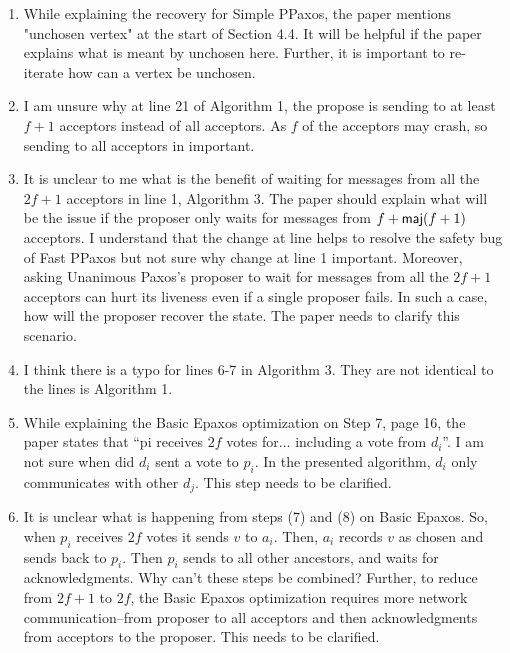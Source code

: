 \documentclass[letterpaper,twocolumn,10pt]{article}
\newenvironment{reviewerquote}
{\list{}{\leftmargin=\parindent\rightmargin=0in}\item[] \itshape \color{ReviewerDarkGray}}%
{\endlist}
\begin{document}
\begin{reviewerquote}
  \begin{enumerate}
    \setcounter{enumi}{0}
    \item
      While explaining the recovery for Simple PPaxos, the paper mentions
      "unchosen vertex" at the start of Section 4.4. It will be helpful if the
      paper explains what is meant by unchosen here. Further, it is important
      to re-iterate how can a vertex be unchosen.
    \item
      I am unsure why at line 21 of Algorithm 1, the propose is sending to at
      least $f+1$ acceptors instead of all acceptors. As $f$ of the acceptors
      may crash, so sending to all acceptors in important.
    \item
      It is unclear to me what is the benefit of waiting for messages from all
      the $2f+1$ acceptors in line 1, Algorithm 3. The paper should explain what
      will be the issue if the proposer only waits for messages from $f +
      \textsf{maj}(f+1)$ acceptors. I understand that the change at line helps to resolve
      the safety bug of Fast PPaxos but not sure why change at line 1
      important. Moreover, asking Unanimous Paxos's proposer to wait for
      messages from all the $2f+1$ acceptors can hurt its liveness even if a
      single proposer fails. In such a case, how will the proposer recover the
      state. The paper needs to clarify this scenario.
    \item
      I think there is a typo for lines 6-7 in Algorithm 3. They are not
      identical to the lines is Algorithm 1.
    \item
      While explaining the Basic Epaxos optimization on Step 7, page 16, the
      paper states that ``pi receives $2f$ votes for... including a vote from
      $d_i$''.  I am not sure when did $d_i$ sent a vote to $p_i$. In the
      presented algorithm, $d_i$ only communicates with other $d_j$. This step
      needs to be clarified.
    \item
      It is unclear what is happening from steps (7) and (8) on Basic Epaxos.
      So, when $p_i$ receives $2f$ votes it sends $v$ to $a_i$. Then, $a_i$
      records $v$ as chosen and sends back to $p_i$. Then $p_i$ sends to all
      other ancestors, and waits for acknowledgments. Why can't these steps be
      combined? Further, to reduce from $2f+1$ to $2f$, the Basic Epaxos
      optimization requires more network communication--from proposer to all
      acceptors and then acknowledgments from acceptors to the proposer. This
      needs to be clarified.
  \end{enumerate}


\end{reviewerquote}
\end{document}
